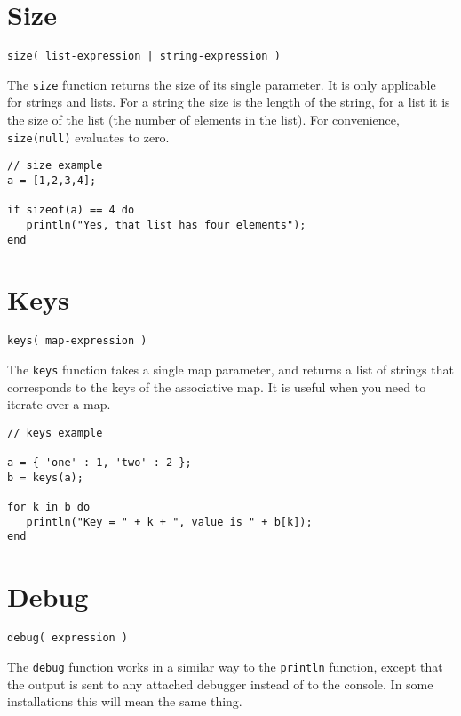 \section{Size}

\begin{Verbatim}
size( list-expression | string-expression )
\end{Verbatim}

The \Verb+size+ function returns the size of its single parameter. It is only applicable for strings and lists. For a string the size is the length of the string, for a list it is the size of the list (the number of elements in the list). For convenience, \verb+size(null)+ evaluates to zero.

\begin{lstlisting}[caption={Size example}]
// size example
a = [1,2,3,4];

if sizeof(a) == 4 do
   println("Yes, that list has four elements");
end

\end{lstlisting}
\section{Keys}

\begin{Verbatim}
keys( map-expression )
\end{Verbatim}

The \Verb+keys+ function takes a single map parameter, and returns a list of strings that corresponds to the keys of the associative map. It is useful when you need to iterate over a map.

\begin{lstlisting}[caption={Keys example}]
// keys example

a = { 'one' : 1, 'two' : 2 };
b = keys(a);

for k in b do
   println("Key = " + k + ", value is " + b[k]);
end

\end{lstlisting}

\section{Debug}

\begin{Verbatim}
debug( expression )
\end{Verbatim}

The \Verb+debug+ function works in a similar way to the \verb+println+ function, except that the output is sent to any attached debugger instead of to the console. In some \Reflex installations this will mean the same thing.

